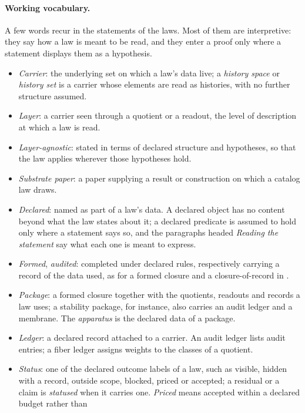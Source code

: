 \paragraph{Working vocabulary.} A few words recur in the statements of the
laws.  Most of them are interpretive: they say how a law is meant to be
read, and they enter a proof only where a statement displays them as a
hypothesis.
\begin{itemize}[topsep=2pt,itemsep=1pt]
  \item \emph{Carrier}: the underlying set on which a law's data live;
    a \emph{history space} or \emph{history set} is a carrier whose
    elements are read as histories, with no further structure assumed.
  \item \emph{Layer}: a carrier seen through a quotient or a readout, the
    level of description at which a law is read.
  \item \emph{Layer-agnostic}: stated in terms of declared structure
    and hypotheses, so that the law applies wherever those hypotheses hold.
  \item \emph{Substrate paper}: a paper supplying a result or construction
    on which a catalog law draws.
  \item \emph{Declared}: named as part of a law's data. A declared object
    has no content beyond what the law states about it; a declared
    predicate is assumed to hold only where a statement says so, and the
    paragraphs headed \emph{Reading the statement} say what each one is
    meant to express.
  \item \emph{Formed}, \emph{audited}: completed under declared rules,
    respectively carrying a record of the data used, as for a formed
    closure and a closure-of-record in .
  \item \emph{Package}: a formed closure together with the quotients,
    readouts and records a law uses; a stability package, for instance,
    also carries an audit ledger and a membrane.  The \emph{apparatus}
    is the declared data of a package.
  \item \emph{Ledger}: a declared record attached to a carrier. An audit
    ledger lists audit entries; a fiber ledger assigns weights to the
    classes of a quotient.
  \item \emph{Status}: one of the declared outcome labels of a law, such
    as visible, hidden with a record, outside scope, blocked, priced or
    accepted; a residual or a claim is \emph{statused} when it carries one.
    \emph{Priced} means accepted within a declared budget rather than

\end{itemize}
